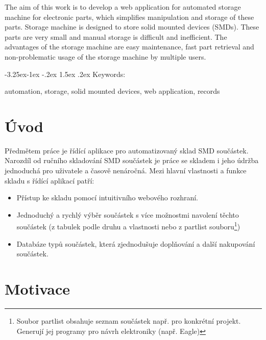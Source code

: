 \documentclass[12pt, a4paper, oneside]{article}
\makeatletter
\renewcommand\paragraph{\@startsection{paragraph}{4}{\z@}%
      {-3.25ex\@plus -1ex \@minus -.2ex}%
      {1.5ex \@plus .2ex}%
      {\normalfont\normalsize\bfseries}}
\makeatother
\begin{document}
The aim of this work is to develop a web application for automated storage machine for electronic parts, which simplifies manipulation and storage of these parts. Storage machine is designed to store solid mounted devices (SMDs). These parts are very small and manual storage is difficult and inefficient. The advantages of the storage machine are easy maintenance, fast part retrieval and non-problematic usage of the storage machine by multiple users.

\paragraph{Keywords:}

automation, storage, solid mounted devices, web application, records

\newpage

\setcounter{page}{1}  %


\tableofcontents{}

\newpage

\pagestyle{plain}

\section*{Úvod}  %

Předmětem práce je řídící aplikace pro automatizovaný sklad SMD součástek. Narozdíl od ručního skladování SMD součástek je práce se skladem i jeho údržba jednoduchá pro uživatele a časově nenáročná. Mezi hlavní vlastnosti a funkce skladu s řídící aplikací patří:
\begin{itemize}
\item Přístup ke skladu pomocí intuitivního webového rozhraní.
\item Jednoduchý a rychlý výběr součástek s více možnostmi navolení těchto součástek (z tabulek podle druhu a vlastnosti nebo z partlist souboru\footnote{Soubor partlist obsahuje seznam součástek např. pro konkrétní projekt. Generují jej programy pro návrh elektroniky (např. Eagle)})
\item Databáze typů součástek, která zjednodušuje doplňování a další nakupování součástek.
\end{itemize}

\section{Motivace}
\end{document}
